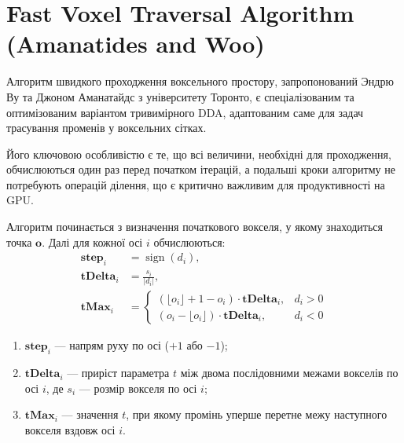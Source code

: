 \section{Fast Voxel Traversal Algorithm\\(Amanatides and Woo)}

Алгоритм швидкого проходження воксельного простору, запропонований Эндрю Ву та Джоном Аманатайдс з університету Торонто, є спеціалізованим та оптимізованим варіантом тривимірного DDA, адаптованим саме для задач трасування променів у воксельних сітках.

Його ключовою особливістю є те, що всі величини, необхідні для проходження, обчислюються один раз перед початком ітерацій, а подальші кроки алгоритму не потребують операцій ділення, що є критично важливим для продуктивності на GPU.\cite{Amanatides}

\newpage

\begin{figure}[ht!]
    \centering
    
    \caption{}
    \label{fig:amanatides}
\end{figure}

Алгоритм починається з визначення початкового вокселя, у якому знаходиться точка $\mathbf{o}$. Далі для кожної осі $i$ обчислюються:
\begin{align*}
    \mathbf{step}_i    &= \operatorname*{sign}(d_i),\\
    \mathbf{tDelta}_i  &= \frac{s_i}{|d_i|},\\
    \mathbf{tMax}_i    &= \begin{cases}
        (\lfloor o_i \rfloor + 1 - o_i) \cdot \mathbf{tDelta}_i, & d_i > 0 \\
        (o_i - \lfloor o_i \rfloor) \cdot \mathbf{tDelta}_i, & d_i < 0
    \end{cases}
\end{align*}

\begin{enumerate}[itemsep=0pt]
    \item $\mathbf{step}_i$ --- напрям руху по осі ($+1$ або $-1$);
    \item $\mathbf{tDelta}_i$ --- приріст параметра $t$ між двома послідовними межами вокселів по осі $i$, де $s_i$ --- розмір вокселя по осі $i$;
    \item $\mathbf{tMax}_i$ --- значення $t$, при якому промінь уперше перетне межу наступного вокселя вздовж осі $i$.
\end{enumerate}

